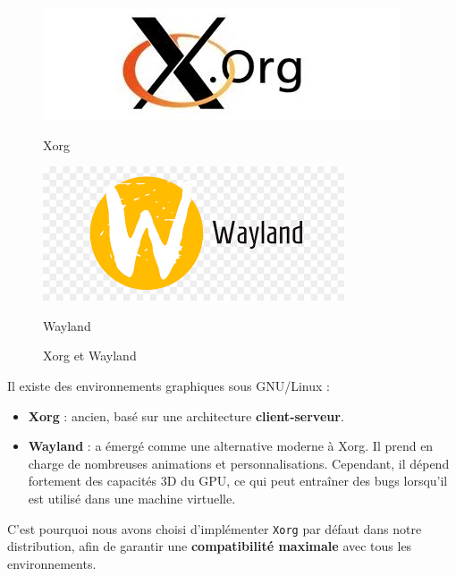\begin{figure}[H]
  \centering
  \begin{minipage}[b]{0.30\textwidth}
    \includegraphics[width=\textwidth]{images_pfe/xorg.jpeg}
    \caption{Xorg}
  \end{minipage}\hfill
  \begin{minipage}[b]{0.30\textwidth}
    \includegraphics[width=\textwidth]{images_pfe/wayland.png}
    \caption{Wayland}
  \end{minipage}
  \caption{Xorg et Wayland}
  \label{fig:xorgwayland}
\end{figure}
\FloatBarrier

Il existe des environnements graphiques sous GNU/Linux :

\begin{itemize}
    \item \textbf{Xorg} : ancien, basé sur une architecture \textbf{client-serveur}.
    \item \textbf{Wayland} : a émergé comme une alternative moderne à Xorg. Il prend en charge de nombreuses animations et personnalisations. Cependant, il dépend fortement des capacités 3D du GPU, ce qui peut entraîner des bugs lorsqu’il est utilisé dans une machine virtuelle.
\end{itemize}

C’est pourquoi nous avons choisi d’implémenter \texttt{Xorg} par défaut dans notre distribution, afin de garantir une \textbf{compatibilité maximale} avec tous les environnements.

